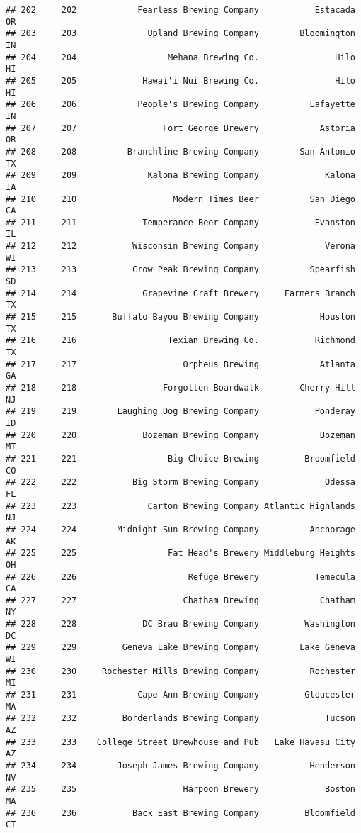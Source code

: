 \documentclass[
]{article}
\begin{document}
\begin{verbatim}
## 202     202            Fearless Brewing Company           Estacada    OR
## 203     203              Upland Brewing Company        Bloomington    IN
## 204     204                  Mehana Brewing Co.               Hilo    HI
## 205     205             Hawai'i Nui Brewing Co.               Hilo    HI
## 206     206            People's Brewing Company          Lafayette    IN
## 207     207                 Fort George Brewery            Astoria    OR
## 208     208          Branchline Brewing Company        San Antonio    TX
## 209     209              Kalona Brewing Company             Kalona    IA
## 210     210                   Modern Times Beer          San Diego    CA
## 211     211             Temperance Beer Company           Evanston    IL
## 212     212           Wisconsin Brewing Company             Verona    WI
## 213     213           Crow Peak Brewing Company          Spearfish    SD
## 214     214             Grapevine Craft Brewery     Farmers Branch    TX
## 215     215       Buffalo Bayou Brewing Company            Houston    TX
## 216     216                  Texian Brewing Co.           Richmond    TX
## 217     217                     Orpheus Brewing            Atlanta    GA
## 218     218                 Forgotten Boardwalk        Cherry Hill    NJ
## 219     219        Laughing Dog Brewing Company           Ponderay    ID
## 220     220             Bozeman Brewing Company            Bozeman    MT
## 221     221                  Big Choice Brewing         Broomfield    CO
## 222     222           Big Storm Brewing Company             Odessa    FL
## 223     223              Carton Brewing Company Atlantic Highlands    NJ
## 224     224        Midnight Sun Brewing Company          Anchorage    AK
## 225     225                  Fat Head's Brewery Middleburg Heights    OH
## 226     226                      Refuge Brewery           Temecula    CA
## 227     227                     Chatham Brewing            Chatham    NY
## 228     228             DC Brau Brewing Company         Washington    DC
## 229     229         Geneva Lake Brewing Company        Lake Geneva    WI
## 230     230     Rochester Mills Brewing Company          Rochester    MI
## 231     231            Cape Ann Brewing Company         Gloucester    MA
## 232     232         Borderlands Brewing Company             Tucson    AZ
## 233     233    College Street Brewhouse and Pub   Lake Havasu City    AZ
## 234     234        Joseph James Brewing Company          Henderson    NV
## 235     235                     Harpoon Brewery             Boston    MA
## 236     236           Back East Brewing Company         Bloomfield    CT

\end{verbatim}
\end{document}
